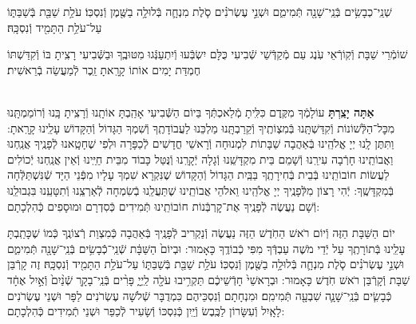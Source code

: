 \documentclass[twoside, openany, parskip=half, 11pt]{book}
\begin{document}
שְׁנֵֽי־כְבָשִׂ֥ים בְּֿנֵֽי־שָׁנָ֖ה תְּֿמִימִ֑ם וּשְׁנֵ֣י עֶשְׂרֹנִ֗ים סֹ֧לֶת מִנְחָ֛ה בְּֿלוּלָ֥ה בַשֶּׁ֖מֶן וְֿנִסְכּֽוֹ׃ עֹלַ֥ת שַׁבַּ֖ת בְּֿשַׁבַּתּ֑וֹ עַל־עֹלַ֥ת הַתָּמִ֖יד וְֿנִסְכָּֽהּ׃

 שׁוֹמְֿרֵי שַׁבָּת וְֿקֽוֹרְֿאֵי עֹֽנֶג עַם מְֿקַדְּֿשֵׁי שְֿׁבִיעִי כֻּלָּם יִשְׂבְּֿעוּ וְֿיִתְעַנְּֿגוּ מִטּוּבֶֽךָ וּבַשְּֿׁבִיעִי רָצִֽיתָ בּוֹ וְֿקִדַּשְׁתּוֹ חֶמְדַּת יָמִים אוֹתוֹ קָרָֽאתָ זֵֽכֶר לְֿמַעֲשֵׂה בְֿרֵאשִׁית׃

\shabboskiddushhayom {}

\begin{sometimes}

\label{shabbosroshchodesh}
\\
\textbf{אַתָּה יָצַֽרְתָּ}
 עוֹלָמְֿךָ מִקֶּֽדֶם כִּלִּֽיתָ מְֿלַאכְתְּֿךָ בַּיוֹם הַשְּֿֿׁבִיעִי אָהַֽבְתָּ אוֹתָֽנוּ וְֿרָצִֽיתָ בָּֽנוּ וְֿרוֹמַמְתָּֽנוּ מִכׇּל־הַלְּֿשׁוֹנוֹת וְֿקִדַּשְׁתָּֽנוּ בְּֿמִצְוֹתֶֽיךָ וְֿקֵרַבְתָּֽנוּ מַלְכֵּנוּ לַעֲבוֹדָתֶֽךָ וְֿשִׁמְךָ הַגָּדוֹל וְֿהַקָּדוֹשׁ עָלֵֽינוּ קָרָֽאתָ: וַתִּתֶּן לָֽנוּ יְיָ אֱלֹהֵֽינוּ בְּֿאַהֲבָה שַׁבָּתוֹת לִמְנוּחָה וְֿרָאשֵׁי חֳדָשִׁים לְֿכַפָּרָה וּלְפִי שֶׁחָטָֽאנוּ לְֿפָנֶֽיךָ אֲנַֽחְנוּ וַאֲבוֹתֵֽינוּ חָרְֿבָה עִירֵֽנוּ וְֿשָׁמֵם בֵּית מִקְדָּשֵֽׁנוּ וְֿגָלָה יְֿקָרֵֽנוּ וְֿנֻּטַּל כָּבוֹד מִבֵּית חַיֵּֽינוּ וְֿאֵין אֲנַֽחְנוּ יְֿכוֹלִים לַעֲשׂוֹת חוֹבוֹתֵֽינוּ בְּֿבֵית בְּֿחִירָתֶֽךָ בַּבַּֽיִת הַגָּדוֹל וְֿהַקָּדוֹשׁ שֶׁנִּקְרָא שִׁמְךָ עָלָיו מִפְּֿנֵי הַיָּד שְֿׁנִּשְׁתַּלְּֿחָה בְּֿמִקְדָּשֶֽׁךָ: יְֿהִי רָצוֹן מִלְּֿפָנֶֽיךָ יְיָ אֱלֹהֵֽינוּ וֵאלֹהֵי אֲבוֹתֵֽינוּ שֶׁתַּעֲלֵֽנוּ בְֿשִׂמְחָה לְֿאַרְצֵֽנוּ וְֿתִטָּעֵֽנוּ בִּגְבוּלֵֽנוּ וְֿשָׁם נַעֲשֶׂה לְֿפָנֶֽיךָ אֶת־קׇרְבְּֿנוֹת חוֹבוֹתֵֽינוּ תְּֿמִידִים כְּֿסִדְרָם וּמוּסָפִים כְּֿהִלְכָתָם:

 יוֹם הַשַּׁבָּת הַזֶּה וְֿיוֹם רֹאשׁ הַחֹֽדֶשׁ הַזֶּה נַעֲשֶׂה וְֿנַקְרִיב לְֿפָנֶֽיךָ בְּֿאַהֲבָה כְּֿמִצְוַת רְֿצוֹנֶֽךָ כְּֿמוֹ שֶׁכָּתַֽבְתָּ עָלֵֽינוּ בְּֿתוֹרָתֶֽךָ עַל יְֿדֵי מֹשֶׁה עַבְדְּֿךָ מִפִּי כְֿבוֹדֶֽךָ כָּאָמוּר: וּבְיוֹם֙ הַשַּׁבָּ֔ת שְֿׁנֵֽי־כְֿֿבָשִׂ֥ים בְּֿנֵֽי־שָׁנָ֖ה תְּֿמִימִ֑ם וּשְׁנֵ֣י עֶשְׂרֹנִ֗ים סֹ֧לֶת מִנְחָ֛ה בְּֿלוּלָ֥ה בַשֶּׁ֖מֶן וְֿנִסְכּֽוֹ׃ עֹלַ֥ת שַׁבַּ֖ת בְּֿשַׁבַּתּ֑וֹ עַל־עֹלַ֥ת הַתָּמִ֖יד וְֿנִסְכָּֽהּ׃ זֶה קָרְֿבַּן שַׁבָּת וְֿקָרְֿבַּן רֹאשׁ חֹֽדֶשׁ כָּאָמוּר: וּבְרָאשֵׁי֙ חָדְֿשֵׁיכֶ֔ם תַּקְרִ֥יבוּ עֹלָ֖ה לַֽיְיָ֑ פָּרִ֨ים בְּֿנֵֽי־בָקָ֤ר שְֿׁנַ֨יִם֙ וְֿאַ֣יִל אֶחָ֔ד כְּֿבָשִׂ֧ים בְּֿנֵֽי־שָׁנָ֛ה שִׁבְעָ֖ה תְּֿמִימִֽם׃ וּמִנְחָתָם וְֿנִסְכֵּיהֶם כִּמְדֻבָּר שְֿׁלֹשָׁה עֶשְׂרֹנִים לַפָּר וּשְׁנֵי עֶשְׂרֹנִים לָאָֽיִל וְֿעִשָּׂרוֹן לַכֶּֽבֶשׂ וְֿיַֽיִן כְּֿנִסְכּוֹ וְֿשָׂעִיר לְֿכַפֵּר וּשְׁנֵי תְֿמִידִים כְּֿהִלְכָתָם:


\end{sometimes}
\end{document}
